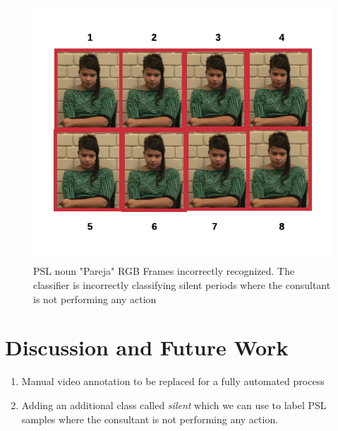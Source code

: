 \documentclass[twocolumn,conference]{article}
\begin{document}
\begin{figure}[hbt!]
\includegraphics[width=\linewidth]{images/pareja-rgb-frame-wrong.png}
\caption{PSL noun "Pareja" RGB Frames incorrectly recognized. The classifier is incorrectly classifying silent periods where the consultant is not performing any action}
\label{fig:rgb-pareja-wrong-sample}
\end{figure}

\section{Discussion and Future Work}\label{discussion-future-work}
\begin{enumerate}[i]
\item Manual video annotation to be replaced for a fully automated process
\item Adding an additional class called \textit{silent} which we can use to label PSL samples where the consultant is not performing any action.

\end{enumerate}
\end{document}
